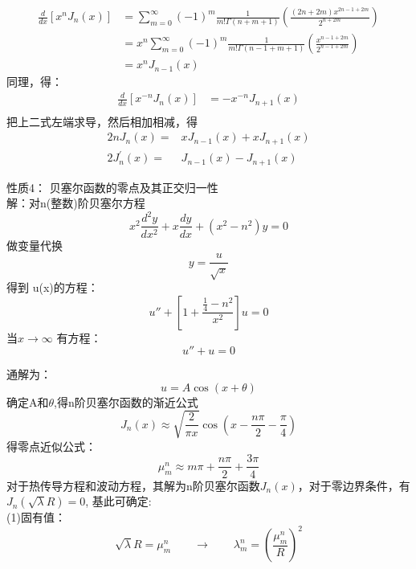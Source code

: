 \begin{frame}
	\begin{equation*}
		\begin{split}
			\frac{d}{dx} [x^n J_n(x)] &=\sum\limits_{m=0}^{\infty} (-1)^m  
			\frac{1}{m! \Gamma(n+m+1) } (\frac{(2n+2m)x^{2n-1+2m}}{2^{n+2m}})\\
			&=x^n\sum\limits_{m=0}^{\infty} (-1)^m  
			\frac{1}{m! \Gamma(n-1+m+1) } (\frac{x^{n-1+2m}}{2^{n-1+2m}})\\ 
			&=x^n J_{n-1}(x)
		\end{split}
	\end{equation*}	
	同理，得：
	\begin{equation*}
		\begin{split}
		\frac{d}{d x}\left[x^{-n} J_{n}(x)\right]&=-x^{-n} J_{n+1}(x) \\
		\end{split}
	\end{equation*}	 
	把上二式左端求导，然后相加相减，得
	\begin{equation*}
		\begin{split}
		2 n J_{n}(x)=&x J_{n-1}(x)+x J_{n+1}(x) \\
		2 J_{n}^{\prime}(x)=&J_{n-1}(x)-J_{n+1}(x)
		\end{split}
	\end{equation*}	 	
\end{frame}

\begin{frame}
	\alert{性质4：} 贝塞尔函数的零点及其正交归一性\\
	\alert{解：}对n(整数)阶贝塞尔方程
	\begin{equation*}
		x^2\frac{d^2y}{dx^2} + x\frac{dy}{dx} +(x^2 -n^2)y=0
	\end{equation*}
	做变量代换 \[ y=\frac{u}{\sqrt{x}}\] 
	得到 u(x)的方程：
	\begin{equation*}
		u'' +[1+\frac{\frac{1}{4}-n^2}{x^2}] u=0
	\end{equation*}
	当$x \to \infty $ 有方程：
	\begin{equation*}
		u'' + u=0 
	\end{equation*}	
\end{frame}	

\begin{frame}
	通解为：\[u=A\cos(x+\theta)\]
	确定A和$\theta$,得n阶贝塞尔函数的渐近公式\\
	\begin{equation*}
		J_{n}(x) \approx \sqrt{\frac{2}{\pi x}} \cos \left(x-\frac{n \pi}{2}-\frac{\pi}{4}\right)
	\end{equation*}
	得零点近似公式：
	\begin{equation*}
		\mu_{m}^{n} \approx m \pi+\frac{n \pi}{2}+\frac{3 \pi}{4}
	\end{equation*}
	对于热传导方程和波动方程，其解为n阶贝塞尔函数$J_n(x)$，对于零边界条件，有$J_n(\sqrt{\lambda}R)=0$,
	基此可确定:\\
	(1)固有值：
	\[ \sqrt{\lambda}R = \mu_{m}^{n}  \qquad \to \qquad \lambda_m ^n =(\frac{\mu_{m}^{n}}{R})^2 \]
\end{frame}	

